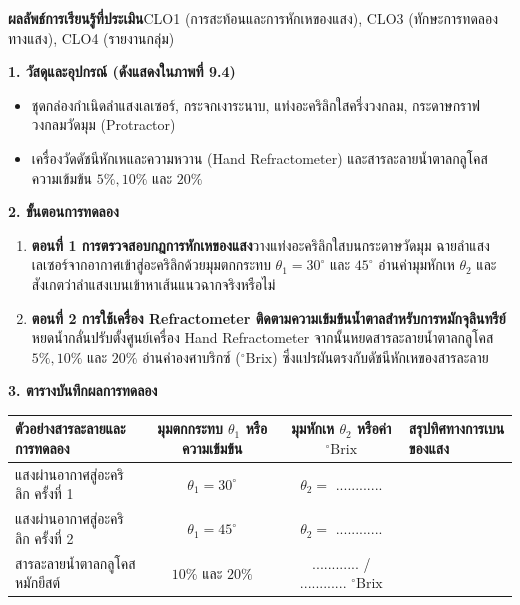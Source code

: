 \begin{labbox}
\noindent\textbf{ผลลัพธ์การเรียนรู้ที่ประเมิน}\quad CLO1 (การสะท้อนและการหักเหของแสง), CLO3 (ทักษะการทดลองทางแสง), CLO4 (รายงานกลุ่ม)

\vspace{4pt}
\noindent\textbf{1. วัสดุและอุปกรณ์ (ดังแสดงใน\mbox{ภาพที่} 9.4)}
\begin{itemize}
    \item ชุดกล่องกำเนิดลำแสงเลเซอร์, กระจกเงาระนาบ, แท่งอะคริลิกใสครึ่งวงกลม, กระดาษกราฟวงกลมวัดมุม (Protractor)
    \item เครื่องวัดดัชนีหักเหและความหวาน (Hand Refractometer) และสารละลายน้ำตาลกลูโคสความเข้มข้น $5\%, 10\%$ และ $20\%$
\end{itemize}

\noindent\textbf{2. ขั้นตอนการทดลอง}
\begin{enumerate}
    \item \textbf{ตอนที่ 1 การตรวจสอบกฎการหักเหของแสง}\quad วางแท่งอะคริลิกใสบนกระดาษวัดมุม ฉายลำแสงเลเซอร์จากอากาศเข้าสู่อะคริลิกด้วยมุมตกกระทบ $\theta_1 = 30^\circ$ และ $45^\circ$ อ่านค่ามุมหักเห $\theta_2$ และสังเกตว่าลำแสงเบนเข้าหาเส้นแนวฉากจริงหรือไม่
    \item \textbf{ตอนที่ 2 การใช้เครื่อง Refractometer ติดตามความเข้มข้นน้ำตาลสำหรับการหมักจุลินทรีย์}\quad หยดน้ำกลั่นปรับตั้งศูนย์เครื่อง Hand Refractometer จากนั้นหยดสารละลายน้ำตาลกลูโคส $5\%, 10\%$ และ $20\%$ อ่านค่าองศาบริกซ์ ($^\circ\text{Brix}$) ซึ่งแปรผันตรงกับดัชนีหักเหของสารละลาย
\end{enumerate}

\noindent\textbf{3. ตารางบันทึกผลการทดลอง}
\begin{center}
\footnotesize\setlength{\tabcolsep}{3.5pt}
\begin{tabularx}{\linewidth}{>{\raggedright\arraybackslash}X c c >{\raggedright\arraybackslash}X}
\toprule
\textbf{ตัวอย่างสารละลายและการทดลอง} & \textbf{มุมตกกระทบ $\theta_1$ หรือความเข้มข้น} & \textbf{มุมหักเห $\theta_2$ หรือค่า $^\circ\text{Brix}$} & \textbf{สรุปทิศทางการเบนของแสง} \\
\midrule
แสงผ่านอากาศสู่อะคริลิก ครั้งที่ 1 & $\theta_1 = 30^\circ$ & $\theta_2 = $ ............ & \dotfill \\
แสงผ่านอากาศสู่อะคริลิก ครั้งที่ 2 & $\theta_1 = 45^\circ$ & $\theta_2 = $ ............ & \dotfill \\
สารละลายน้ำตาลกลูโคสหมักยีสต์ & $10\%$ และ $20\%$ & ............ / ............ $^\circ\text{Brix}$ & \dotfill \\
\bottomrule
\end{tabularx}
\end{center}
\end{labbox}

